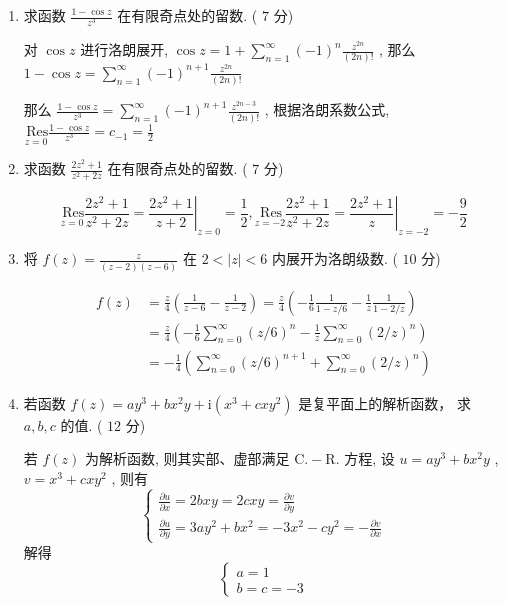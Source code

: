 \documentclass[cn,11pt,fancy,hide]{elegantbook}
\newcommand{\ii}{\mathrm{i}}
\newcommand{\Res}{\,\mathrm{Res}}
\begin{document}
\begin{enumerate}
	\item 求函数 $\frac{1-\cos z}{z^3}$ 在有限奇点处的留数. ( $7$ 分)
	\begin{solution}
		对 $\cos z$ 进行洛朗展开, $\cos z=1+\sum_{n=1}^{\infty}(-1)^n\frac{z^{2n}}{(2n)!}$ , 那么 $1-\cos z=\sum_{n=1}^{\infty}(-1)^{n+1}\frac{z^{2n}}{(2n)!}$
		
		那么 $\frac{1-\cos z}{z^3}=\sum_{n=1}^{\infty}(-1)^{n+1}\frac{z^{2n-3}}{(2n)!}$ , 根据洛朗系数公式, $\underset{z=0}{\Res}\frac{1-\cos z}{z^3}=c_{-1}=\frac{1}{2}$
	\end{solution}
	
	\item 求函数 $\frac{2z^2+1}{z^2+2z}$ 在有限奇点处的留数. ( $7$ 分)
	\begin{solution}
		\begin{equation*}
			\underset{z=0}{\Res}\frac{2z^2+1}{z^2+2z}=\left.\frac{2z^2+1}{z+2} \right|_{z=0}=\frac{1}{2} , 
			\underset{z=-2}{\Res}\frac{2z^2+1}{z^2+2z}=\left.\frac{2z^2+1}{z}\right|_{z=-2}=-\frac{9}{2}
		\end{equation*}
		
	\end{solution}
	
	\item 将 $f(z)=\frac{z}{(z-2)(z-6)}$ 在 $2<|z|<6$ 内展开为洛朗级数. ( $10$ 分)
	\begin{solution}
		\begin{align*}
			f(z)&=\frac{z}{4}\left( \frac{1}{z-6}-\frac{1}{z-2}\right) =\frac{z}{4}\left( -\frac{1}{6}\frac{1}{1-z/6}-\frac{1}{z}\frac{1}{1-2/z}\right) \\
			&=\frac{z}{4}\left( -\frac{1}{6}\sum_{n=0}^{\infty}(z/6)^n-\frac{1}{z}\sum_{n=0}^{\infty}(2/z)^n\right)\\
			&=-\frac{1}{4}\left( \sum_{n=0}^{\infty}(z/6)^{n+1}+\sum_{n=0}^{\infty}(2/z)^n\right)  
		\end{align*}
	\end{solution}
	
	\item 若函数 $f(z)=a y^{3}+b x^{2} y+\ii\left(x^{3}+c x y^{2}\right)$ 是复平面上的解析函数， 求 $a,b,c$ 的值. ( $12$ 分)
	\begin{solution}
		若 $f(z)$ 为解析函数, 则其实部、虚部满足 $\mathrm{C}.-\mathrm{R}.$ 方程, 设 $u=ay^3+bx^2y$ , $v=x^3+cxy^2$ , 则有
		\begin{equation*}
			\begin{cases}
			\frac{\partial u}{\partial x}=2 b x y=2 c x y=\frac{\partial v}{\partial y}\\
			\frac{\partial u}{\partial y}=3 a y^{2}+b x^{2}=-3 x^{2}-c y^{2}=-\frac{\partial v}{\partial x}
			\end{cases}
		\end{equation*}
		解得\begin{equation*}
			\begin{cases}
			a=1\\
			b=c=-3
			\end{cases}
		\end{equation*}
		

\end{solution}
\end{enumerate}
\end{document}
